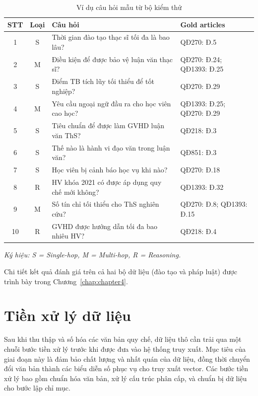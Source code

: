 \begin{table}[htbp]
    \centering
    \caption{Ví dụ câu hỏi mẫu từ bộ kiểm thử}
    \label{tab:vidu_cauhoi}
    \begin{tabular}{ccp{6.5cm}p{3cm}}
        \toprule
        \textbf{STT} & \textbf{Loại} & \textbf{Câu hỏi} & \textbf{Gold articles} \\
        \midrule
        1  & S & Thời gian đào tạo thạc sĩ tối đa là bao lâu?
           & QĐ270: Đ.5 \\
        2  & M & Điều kiện để được bảo vệ luận văn thạc sĩ?
           & QĐ270: Đ.24; QĐ1393: Đ.25 \\
        3  & S & Điểm TB tích lũy tối thiểu để tốt nghiệp?
           & QĐ270: Đ.29 \\
        4  & M & Yêu cầu ngoại ngữ đầu ra cho học viên cao học?
           & QĐ1393: Đ.25; QĐ270: Đ.29 \\
        5  & S & Tiêu chuẩn để được làm GVHD luận văn ThS?
           & QĐ218: Đ.3 \\
        6  & S & Thế nào là hành vi đạo văn trong luận văn?
           & QĐ851: Đ.3 \\
        7  & S & Học viên bị cảnh báo học vụ khi nào?
           & QĐ270: Đ.18 \\
        8  & R & HV khóa 2021 có được áp dụng quy chế mới không?
           & QĐ1393: Đ.32 \\
        9  & M & Số tín chỉ tối thiểu cho ThS nghiên cứu?
           & QĐ270: Đ.8; QĐ1393: Đ.15 \\
        10 & R & GVHD được hướng dẫn tối đa bao nhiêu HV?
           & QĐ218: Đ.4 \\
        \bottomrule
    \end{tabular}
\end{table}

\noindent\textit{Ký hiệu: S = Single-hop, M = Multi-hop, R = Reasoning.}

Chi tiết kết quả đánh giá trên cả hai bộ dữ liệu (đào tạo và pháp luật) được trình
bày trong Chương~\ref{chap:chapter4}.

\section{Tiền xử lý dữ liệu}
\label{sec:tien-xu-ly-du-lieu}

Sau khi thu thập và số hóa các văn bản quy chế, dữ liệu thô cần trải qua một
chuỗi bước tiền xử lý trước khi được đưa vào hệ thống truy xuất. Mục tiêu của
giai đoạn này là đảm bảo chất lượng và nhất quán của dữ liệu, đồng thời chuyển
đổi văn bản thành các biểu diễn số phục vụ cho truy xuất vector. Các bước tiền
xử lý bao gồm chuẩn hóa văn bản, xử lý cấu trúc phân cấp, và chuẩn bị dữ liệu
cho bước lập chỉ mục.


